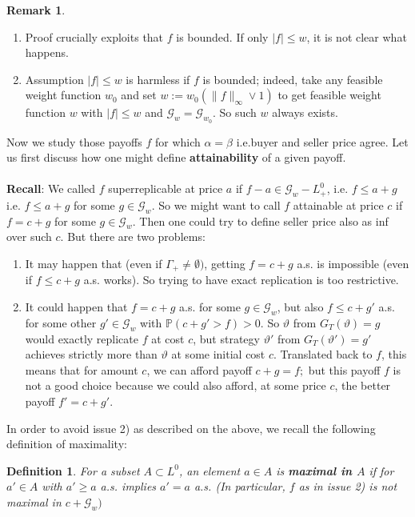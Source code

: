 \documentclass[12pt,a4paper, twoside]{article}
\newtheorem{defn}{Definition}[section]
\theoremstyle{definition}
\newtheorem{rem}{Remark}[section]
\newcommand{\PP}{\mathbb{P}} %
\begin{document}
\begin{rem} \
\begin{enumerate}
\item Proof crucially exploits that $f$ is bounded. If only $|f| \leq w$, it is not clear what happens.
\item Assumption $|f| \leq w$ is harmless if $f$ is bounded; indeed, take any feasible weight function $w_0$ and set $w:=w_0( \|f\|_\infty \vee 1)$ to get feasible weight function $w$ with $|f| \leq w$ and $\mathcal{G}_w= \mathcal{G}_{w_0}$. So such $w$ always exists. 
\end{enumerate}
\end{rem}
Now we study those payoffs $f$ for which $\alpha = \beta$ i.e.buyer and seller price agree. Let us first discuss how one might define \textbf{attainability} of a given payoff. 
\\\\
\textbf{Recall}: We called $f$ superreplicable at price $a$ if $f-a \in \mathcal{G}_w-L_+^0$, i.e. $f \leq a + g$ i.e. $f \leq a + g$ for some $g \in \mathcal{G}_w$. So we might want to call $f$ attainable at price $c$ if $f=c+g$ for some $g \in \mathcal{G}_w$. Then one could try to define seller price also as inf over such $c$. But there are two problems:
\begin{enumerate}
\item It may happen that (even if $\Gamma_+ \neq \emptyset)$, getting $f= c+g$ a.s. is impossible (even if $f \leq c+g$ a.s. works). So trying to have exact replication is too restrictive. 
\item It could happen that $f=c+g$ a.s. for some $g \in \mathcal{G}_w$, but also $f \leq c+g'$ a.s. for some other $g'\in \mathcal{G}_w$ with $\PP(c+g' > f) >0$. So $\vartheta$ from $G_T( \vartheta)=g$ would exactly replicate $f$ at cost $c$, but strategy $\vartheta'$ from $G_T( \vartheta')=g'$ achieves strictly more than $\vartheta$ at some initial cost $c$. Translated back to $f$, this means that for amount $c$, we can afford payoff $c+g=f;$ but this payoff $f$ is not a good choice because we could also afford, at some price $c$, the better payoff $f'=c+g'$.  
\end{enumerate}
In order to avoid issue 2) as described on the above, we recall the following definition of maximality:
\newpage
\begin{defn} For a subset $A \subset L^0$, an element $a \in A$ is \textbf{maximal in $A$} if for $a' \in A$ with $a' \geq a$ a.s. implies $a'=a$ a.s. (In particular, $f$ as in issue 2) is not maximal in $c+ \mathcal{G}_w)$
\end{defn}
\end{document}
